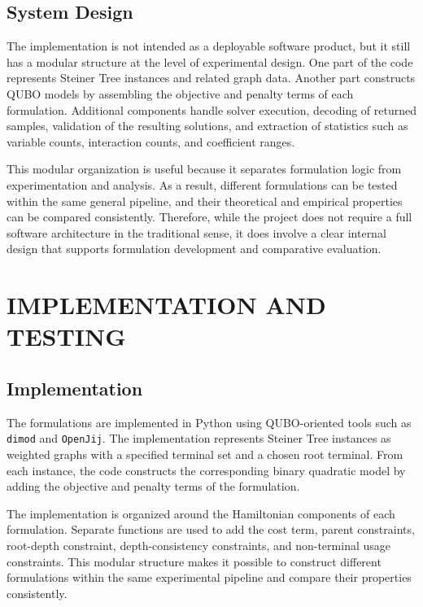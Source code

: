 \documentclass[a4paper,12pt]{report}
\begin{document}
\section{System Design}

The implementation is not intended as a deployable software product, but it still has a modular structure at the level of experimental design. One part of the code represents Steiner Tree instances and related graph data. Another part constructs QUBO models by assembling the objective and penalty terms of each formulation. Additional components handle solver execution, decoding of returned samples, validation of the resulting solutions, and extraction of statistics such as variable counts, interaction counts, and coefficient ranges.

This modular organization is useful because it separates formulation logic from experimentation and analysis. As a result, different formulations can be tested within the same general pipeline, and their theoretical and empirical properties can be compared consistently. Therefore, while the project does not require a full software architecture in the traditional sense, it does involve a clear internal design that supports formulation development and comparative evaluation.


\chapter{IMPLEMENTATION AND TESTING}

\section{Implementation}

The formulations are implemented in Python using QUBO-oriented tools such as \texttt{dimod} and \texttt{OpenJij}. The implementation represents Steiner Tree instances as weighted graphs with a specified terminal set and a chosen root terminal. From each instance, the code constructs the corresponding binary quadratic model by adding the objective and penalty terms of the formulation.

The implementation is organized around the Hamiltonian components of each formulation. Separate functions are used to add the cost term, parent constraints, root-depth constraint, depth-consistency constraints, and non-terminal usage constraints. This modular structure makes it possible to construct different formulations within the same experimental pipeline and compare their properties consistently.
\end{document}
